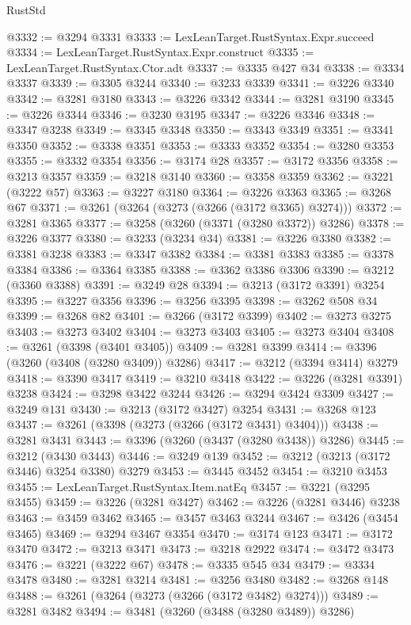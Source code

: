 \begin{lexlean}{RustStd}
\begin{coremodule}
{\begin{coremodule}
{{{{{{{{{{{{{{{{{{{{{{{{{{@3332 := @3294 @3331
@3333 := LexLeanTarget.RustSyntax.Expr.succeed
@3334 := LexLeanTarget.RustSyntax.Expr.construct
@3335 := LexLeanTarget.RustSyntax.Ctor.adt
@3337 := @3335 @427 @34
@3338 := @3334 @3337
@3339 := @3305 @3244
@3340 := @3233 @3339
@3341 := @3226 @3340
@3342 := @3281 @3180
@3343 := @3226 @3342
@3344 := @3281 @3190
@3345 := @3226 @3344
@3346 := @3230 @3195
@3347 := @3226 @3346
@3348 := @3347 @3238
@3349 := @3345 @3348
@3350 := @3343 @3349
@3351 := @3341 @3350
@3352 := @3338 @3351
@3353 := @3333 @3352
@3354 := @3280 @3353
@3355 := @3332 @3354
@3356 := @3174 @28
@3357 := @3172 @3356
@3358 := @3213 @3357
@3359 := @3218 @3140
@3360 := @3358 @3359
@3362 := @3221 (@3222 @57)
@3363 := @3227 @3180
@3364 := @3226 @3363
@3365 := @3268 @67
@3371 := @3261 (@3264 (@3273 (@3266 (@3172 @3365) @3274)))
@3372 := @3281 @3365
@3377 := @3258 (@3260 (@3371 (@3280 @3372)) @3286)
@3378 := @3226 @3377
@3380 := @3233 (@3234 @34)
@3381 := @3226 @3380
@3382 := @3381 @3238
@3383 := @3347 @3382
@3384 := @3381 @3383
@3385 := @3378 @3384
@3386 := @3364 @3385
@3388 := @3362 @3386 @3306
@3390 := @3212 (@3360 @3388)
@3391 := @3249 @28
@3394 := @3213 (@3172 @3391) @3254
@3395 := @3227 @3356
@3396 := @3256 @3395
@3398 := @3262 @508 @34
@3399 := @3268 @82
@3401 := @3266 (@3172 @3399)
@3402 := @3273 @3275
@3403 := @3273 @3402
@3404 := @3273 @3403
@3405 := @3273 @3404
@3408 := @3261 (@3398 (@3401 @3405))
@3409 := @3281 @3399
@3414 := @3396 (@3260 (@3408 (@3280 @3409)) @3286)
@3417 := @3212 (@3394 @3414) @3279
@3418 := @3390 @3417
@3419 := @3210 @3418
@3422 := @3226 (@3281 @3391) @3238
@3424 := @3298 @3422 @3244
@3426 := @3294 @3424 @3309
@3427 := @3249 @131
@3430 := @3213 (@3172 @3427) @3254
@3431 := @3268 @123
@3437 := @3261 (@3398 (@3273 (@3266 (@3172 @3431) @3404)))
@3438 := @3281 @3431
@3443 := @3396 (@3260 (@3437 (@3280 @3438)) @3286)
@3445 := @3212 (@3430 @3443)
@3446 := @3249 @139
@3452 := @3212 (@3213 (@3172 @3446) @3254 @3380) @3279
@3453 := @3445 @3452
@3454 := @3210 @3453
@3455 := LexLeanTarget.RustSyntax.Item.natEq
@3457 := @3221 (@3295 @3455)
@3459 := @3226 (@3281 @3427)
@3462 := @3226 (@3281 @3446) @3238
@3463 := @3459 @3462
@3465 := @3457 @3463 @3244
@3467 := @3426 (@3454 @3465)
@3469 := @3294 @3467 @3354
@3470 := @3174 @123
@3471 := @3172 @3470
@3472 := @3213 @3471
@3473 := @3218 @2922
@3474 := @3472 @3473
@3476 := @3221 (@3222 @67)
@3478 := @3335 @545 @34
@3479 := @3334 @3478
@3480 := @3281 @3214
@3481 := @3256 @3480
@3482 := @3268 @148
@3488 := @3261 (@3264 (@3273 (@3266 (@3172 @3482) @3274)))
@3489 := @3281 @3482
@3494 := @3481 (@3260 (@3488 (@3280 @3489)) @3286)
}}}}}}}}}}}}}}}}}}}}}}}}}}
\end{coremodule}}
\end{coremodule}
\end{lexlean}
